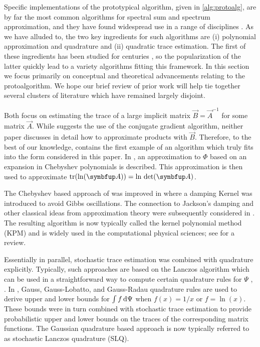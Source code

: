 Specific implementations of the prototypical algorithm, given in \cref{alg:protoalg}, are by far the most common algorithms for spectral sum and spectrum approximation, and they have found widespread use in a range of disciplines \cite{lin_saad_yang_16,ubaru_chen_saad_17}.
As we have alluded to, the two key ingredients for such algorithms are (i) polynomial approximation and quadrature and (ii) quadratic trace estimation. 
The first of these ingredients has been studied for centuries \cite{trefethen_19}, so the popularization of the latter \cite{girard_87,hutchinson_89,skilling_89} quickly lead to a variety algorithms fitting this framework.
In this section we focus primarily on conceptual and theoretical advancements relating to the protoalgorithm.
We hope our brief review of prior work will help tie together several clusters of literature which have remained largely disjoint.


Both \cite{girard_87,hutchinson_89} focus on estimating the trace of a large implicit matrix \( \vec{B} = \vec{A}^{-1} \) for some matrix \( \vec{A} \).
While \cite{girard_87} suggests the use of the conjugate gradient algorithm, neither paper discusses in detail how to approximate products with \( \vec{B} \).
Therefore, to the best of our knowledge, \cite{skilling_89} contains the first example of an algorithm which truly fits into the form considered in this paper.
In \cite{skilling_89}, an approximation to \( \Phi \) based on an expansion in Chebyshev polynomials is described.
This approximation is then used to approximate \( \tr(\ln\A) = \ln \,\det\A \).


The Chebyshev based approach of \cite{skilling_89} was improved in \cite{silver_roder_94} where a damping Kernel was introduced to avoid Gibbs oscillations.
The connection to Jackson's damping and other classical ideas from approximation theory were subsequently considered in \cite{silver_roeder_voter_kress_96}.
The resulting algorithm is now typically called the kernel polynomial method (KPM) and is widely used in the computational physical sciences; see \cite{weisse_wellein_alvermann_fehske_06} for a review.


Essentially in parallel, stochastic trace estimation was combined with quadrature explicitly.
Typically, such approaches are based on the Lanczos algorithm which can be used in a straightforward way to compute certain quadrature rules for \( \Psi \) \cite[Chapter 6]{golub_meurant_09}, \cite{gautschi_06}.
In \cite{bai_fahey_golub_96}, Gauss, Gauss-Lobatto, and Gauss-Radau quadrature rules are used to derive upper and lower bounds for \( \int f \,\textup{d}\Psi \)
when \( f(x) = 1/x \) or \( f = \ln(x) \). 
These bounds were in turn combined with stochastic trace estimation to provide probabilistic upper and lower bounds on the traces of the corresponding matrix functions. 
The Gaussian quadrature based approach is now typically referred to as stochastic Lanczos quadrature (SLQ).


